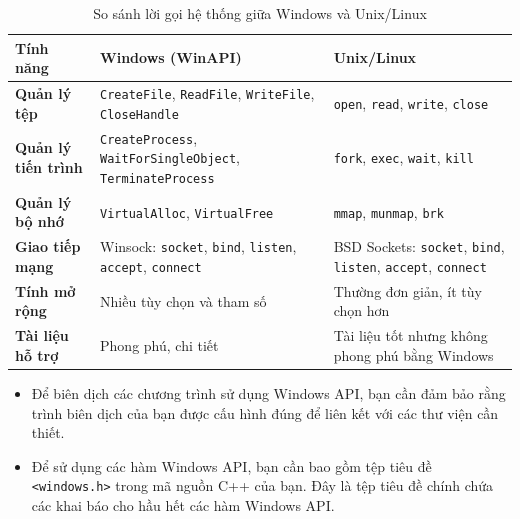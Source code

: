 \begin{frame}
\begin{table}[h]
\centering
\begin{tabular}{|>{\raggedright}m{3cm}|>{\raggedright\arraybackslash}m{4.5cm}|>{\raggedright\arraybackslash}m{4.5cm}|}
\hline
\textbf{Tính năng}             & \textbf{Windows (WinAPI)}                                    & \textbf{Unix/Linux}                                       \\ \hline
\textbf{Quản lý tệp}       & \texttt{CreateFile}, \texttt{ReadFile}, \texttt{WriteFile}, \texttt{CloseHandle}        & \texttt{open}, \texttt{read}, \texttt{write}, \texttt{close}                         \\ \hline
\textbf{Quản lý tiến trình} & \texttt{CreateProcess}, \texttt{WaitForSingleObject}, \texttt{TerminateProcess} & \texttt{fork}, \texttt{exec}, \texttt{wait}, \texttt{kill}                           \\ \hline
\textbf{Quản lý bộ nhớ}    & \texttt{VirtualAlloc}, \texttt{VirtualFree}                           & \texttt{mmap}, \texttt{munmap}, \texttt{brk}                                \\ \hline
\textbf{Giao tiếp mạng}    & Winsock: \texttt{socket}, \texttt{bind}, \texttt{listen}, \texttt{accept}, \texttt{connect}      & BSD Sockets: \texttt{socket}, \texttt{bind}, \texttt{listen}, \texttt{accept}, \texttt{connect} \\ \hline
\textbf{Tính mở rộng}      & Nhiều tùy chọn và tham số                           & Thường đơn giản, ít tùy chọn hơn                 \\ \hline
\textbf{Tài liệu hỗ trợ}   & Phong phú, chi tiết                                 & Tài liệu tốt nhưng không phong phú bằng Windows  \\ \hline
\end{tabular}
\caption{So sánh lời gọi hệ thống giữa Windows và Unix/Linux}
\end{table}
\end{frame}

\begin{frame}
\begin{itemize}
    \item Để biên dịch các chương trình sử dụng Windows API, bạn cần đảm bảo rằng trình biên dịch của bạn được cấu hình đúng để liên kết với các thư viện cần thiết. 
    \item Để sử dụng các hàm Windows API, bạn cần bao gồm tệp tiêu đề \texttt{<windows.h>} trong mã nguồn C++ của bạn. Đây là tệp tiêu đề chính chứa các khai báo cho hầu hết các hàm Windows API.
\end{itemize}
\end{frame}

